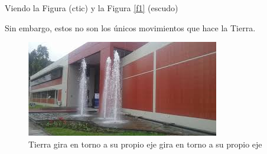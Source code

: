 \documentclass{report}
\begin{document}
\pagebreak

Viendo la Figura (ctic) y la Figura \ref{f1} (escudo)

Sin embargo, estos no son los únicos movimientos que hace la Tierra.
\begin{figure}
\includegraphics[scale=0.4]{ctic}
\caption{Tierra gira en torno a su propio eje gira en torno a su propio eje}
\end{figure}
\end{document}
